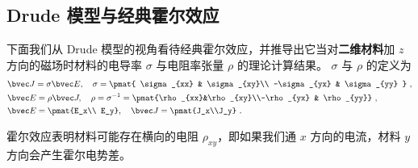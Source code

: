 \subsection{Drude 模型与经典霍尔效应}
下面我们从 Drude 模型的视角看待经典霍尔效应，并推导出它当对\textbf{二维材料}加 $z$ 方向的磁场时材料的电导率 $\sigma$ 与电阻率张量 $\rho$ 的理论计算结果。 $\sigma$ 与 $\rho$ 的定义为
\begin{equation}
\begin{aligned}
&\bvec J=\sigma \bvec E,\quad \sigma=\pmat{
    \sigma_{xx} & \sigma_{xy}\\
    -\sigma_{yx} & \sigma_{yy}
}
~,\\
&\bvec E=\rho \bvec J,\quad \rho = \sigma^{-1} =
\pmat{\rho_{xx}&\rho_{xy}\\-\rho_{yx} & \rho_{yy}}~,\\
&\bvec E=\pmat{E_x\\ E_y},\quad \bvec J = \pmat{J_x\\J_y}~.
\end{aligned}
\end{equation}

霍尔效应表明材料可能存在横向的电阻 $\rho_{xy}$，即如果我们通 $x$ 方向的电流，材料 $y$ 方向会产生霍尔电势差。